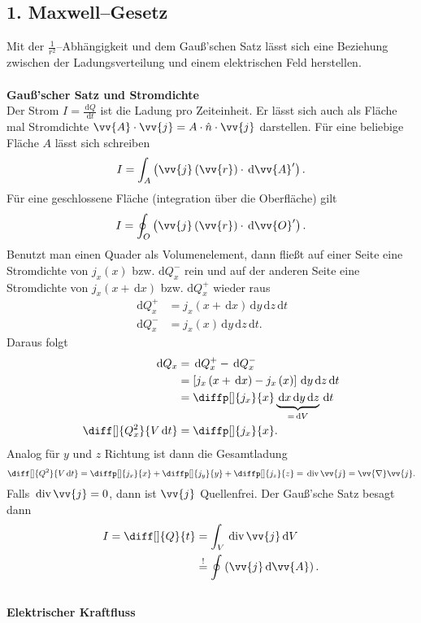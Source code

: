 \documentclass[a4paper,12pt]{article}
\newcommand{\td}{\,\text{d}}
\begin{document}
\subsection{1. Maxwell--Gesetz}
Mit der $\tfrac{1}{r^2}$--Abhängigkeit und dem Gauß'schen Satz lässt sich eine Beziehung zwischen der Ladungsverteilung und einem elektrischen Feld herstellen.
\\\hfill\\\textbf{Gauß'scher Satz und Stromdichte}\\ 
Der Strom $I=\tfrac{\td Q}{\td t}$ ist die Ladung pro Zeiteinheit. Er lässt sich auch als Fläche mal Stromdichte $\vv{A}\cdot \vv{j}=A\cdot \hat{n}\cdot \vv{j}$ darstellen. Für eine beliebige Fläche $A$ lässt sich schreiben
\[ 
        I=\int_{A}^{}\left(\vv{j}\left(\vv{r}\right)\cdot \td \vv{A}'\right)
.\] 
Für eine geschlossene Fläche (integration über die Oberfläche) gilt
\[ 
        I=\oint_{O}^{}\left(\vv{j}\left(\vv{r}\right)\cdot \td \vv{O}'\right)
.\] 
Benutzt man einen Quader als Volumenelement, dann fließt auf einer Seite eine Stromdichte von $j_x(x)$ bzw.\,$\td Q_x^-$ rein und auf der anderen Seite eine Stromdichte von $j_x(x+\td x)$ bzw.\,$\td Q_x^+$ wieder raus
\begin{align*}
        \td Q_x^+&=j_x\left(x+\td x\right)\td y\td z\td t\\
        \td Q_x^-&=j_x\left(x\right)\td y\td z\td t
.\end{align*}
Daraus folgt
\begin{align*}
        \td Q_x&=\td Q_x^+-\td Q_x^-\\
               &=\left[j_x\left(x+\td x\right)-j_x\left(x\right)\right]\td y\td z\td t\\
               &=\diffp[]{j_x}{x}\underbrace{\td x\td y\td z}_{=\td V}\td t\\
        \diff[]{Q_x^2}{V\td t}&=\diffp[]{j_x}{x}
.\end{align*}
Analog für $y$ und $z$ Richtung ist dann die Gesamtladung
\[ 
        \diff[]{Q^2}{V\td t}=\diffp[]{j_x}{x}+\diffp[]{j_y}{y}+\diffp[]{j_z}{z}=\,\text{div}\,\vv{j}=\vv{\nabla }\vv{j}
.\] 
Falls $\,\text{div}\,\vv{j}=0$, dann ist $\vv{j}$ Quellenfrei. Der Gauß'sche Satz besagt dann
\begin{align*}
        I=\diff[]{Q}{t}&=\int_{V}^{}\,\text{div}\,\vv{j}\td V\\
                       &\stackrel{!}{=}\oint_{}^{}\left(\vv{j}\td \vv{A}\right) 
.\end{align*}
\hfill\\\textbf{Elektrischer Kraftfluss}\\ 
\end{document}
